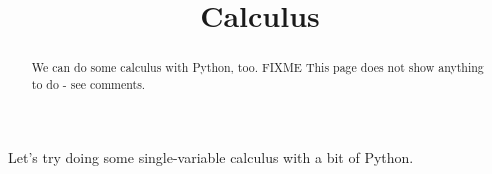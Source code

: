 \documentclass{ximera}
\title{Calculus}
\begin{document}
\begin{abstract}
  We can do some calculus with Python, too.
  FIXME This page does not show anything to do - see comments.
\end{abstract}

Let's try doing some single-variable calculus with a bit of Python.









\end{document}
